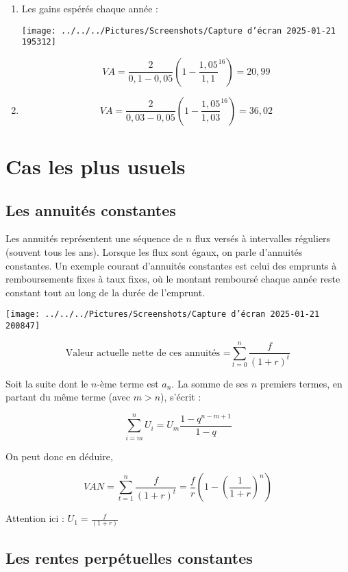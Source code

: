 \documentclass[a4paper, 12pt]{report}
\begin{document}
\begin{enumerate}
	\item Les gains espérés chaque année : 
	
\texttt{[image: ../../../Pictures/Screenshots/Capture d'écran 2025-01-21 195312]}

\[ VA = \frac{2}{0,1-0,05}\left( 1 - \frac{1,05}{1,1}^{16}\right)=20,99  \]

\item \[ VA = \frac{2}{0,03-0,05}\left( 1 - \frac{1,05}{1,03}^{16}\right)=36,02  \]

\end{enumerate}

\section{Cas les plus usuels}

\subsection{Les annuités constantes}

Les annuités représentent une séquence de \( n \) flux versés à intervalles réguliers (souvent tous les ans). Lorsque les flux sont égaux, on parle d'annuités constantes. Un exemple courant d'annuités constantes est celui des emprunts à remboursements fixes à taux fixes, où le montant remboursé chaque année reste constant tout au long de la durée de l'emprunt.

\begin{center}
	\texttt{[image: ../../../Pictures/Screenshots/Capture d'écran 2025-01-21 200847]}
\end{center}

\[ \text{Valeur actuelle nette de ces annuités =}\sum_{t=0}^{n}\frac{f}{(1+r)^t}
 \]

Soit la suite dont le \( n \)-ème terme est \( a_n \). La somme de ses \( n \) premiers termes, en partant du même terme (avec \( m > n \)), s'écrit :

\[
\sum_{i=m}^{n} U_i = U_m \frac{1-q^{n-m+1}}{1-q}
\]

On peut donc en déduire,

\[ VAN = \sum_{t=1}^{n} \frac{f}{(1+r)^t}=\frac{f}{r}\left( 1-\left( \frac{1}{1+r}\right) ^n\right)   \]

Attention ici : \( U_1=\frac{f}{(1+r)} \)

\subsection{Les rentes perpétuelles constantes}
\end{document}
